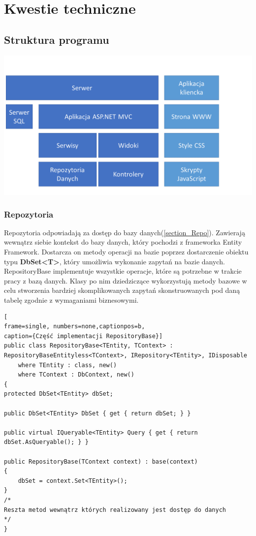 \newpage
{\let\cleardoublepage\relax \chapter{Kwestie techniczne}}

\section{Struktura programu}

\begin{center}
	\includegraphics[width=\textwidth]{images/Structure.png}
\end{center}


\subsection{Repozytoria}

Repozytoria odpowiadają za dostęp do bazy danych(\ref{section_Repo}). Zawierają wewnątrz siebie kontekst do bazy danych, który pochodzi z frameworka Entity Framework. Dostarcza on metody operacji na bazie poprzez dostarczenie obiektu typu \textbf{DbSet<T>}, który umożliwia wykonanie zapytań na bazie danych. RepositoryBase implementuje wszystkie operacje, które są potrzebne w trakcie pracy z bazą danych. Klasy po nim dziedziczące wykorzystują metody bazowe w celu stworzenia bardziej skomplikowanych zapytań skonstruowanych pod daną tabelę zgodnie z wymaganiami biznesowymi. 

\begin{minipage}{\linewidth}
\begin{lstlisting}[
frame=single, numbers=none,captionpos=b, 
caption={Część implementacji RepositoryBase}]
public class RepositoryBase<TEntity, TContext> : RepositoryBaseEntityless<TContext>, IRepository<TEntity>, IDisposable
	where TEntity : class, new()
	where TContext : DbContext, new()
{
protected DbSet<TEntity> dbSet;

public DbSet<TEntity> DbSet { get { return dbSet; } }

public virtual IQueryable<TEntity> Query { get { return dbSet.AsQueryable(); } }

public RepositoryBase(TContext context) : base(context)
{
	dbSet = context.Set<TEntity>();
}
/*
Reszta metod wewnątrz których realizowany jest dostęp do danych
*/
}
\end{lstlisting}
\end{minipage}

